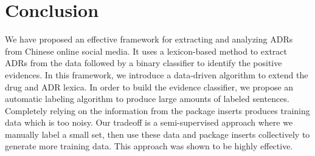 \section{Conclusion}
\label{conclu}
We have proposed an effective framework for extracting and analyzing ADRs from Chinese online social media. It uses a lexicon-based method to extract ADRs from the data followed by a binary classifier to identify the positive evidences. In this framework, we introduce a data-driven algorithm to extend the drug and ADR lexica. In order to build the evidence classifier, we propose an automatic labeling algorithm to produce large amounts of labeled sentences. Completely relying on the information from the package inserts produces training data which is too noisy. Our tradeoff is a semi-supervised approach where we manually label a small set, then use these data and package inserts collectively to generate more training data. This approach was shown to be highly effective. 
